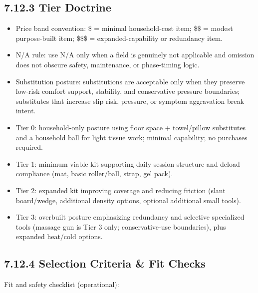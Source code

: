 \documentclass[10pt]{article}
\begin{document}
\subsection*{7.12.3 Tier Doctrine}
{}

\begin{itemize}
\item Price band convention: \$ = minimal household-cost item; \$\$ = modest purpose-built item; \$\$\$ = expanded-capability or redundancy item.
\item N/A rule: use N/A only when a field is genuinely not applicable and omission does not obscure safety, maintenance, or phase-timing logic.
\item Substitution posture: substitutions are acceptable only when they preserve low-risk comfort support, stability, and conservative pressure boundaries; substitutes that increase slip risk, pressure, or symptom aggravation break intent.
\item Tier 0: household-only posture using floor space + towel/pillow substitutes and a household ball for light tissue work; minimal capability; no purchases required.
\item Tier 1: minimum viable kit supporting daily session structure and deload compliance (mat, basic roller/ball, strap, gel pack).
\item Tier 2: expanded kit improving coverage and reducing friction (slant board/wedge, additional density options, optional additional small tools).
\item Tier 3: overbuilt posture emphasizing redundancy and selective specialized tools (massage gun is Tier 3 only; conservative-use boundaries), plus expanded heat/cold options.
\end{itemize}

\subsection*{7.12.4 Selection Criteria \& Fit Checks}
{}

Fit and safety checklist (operational):
\end{document}
